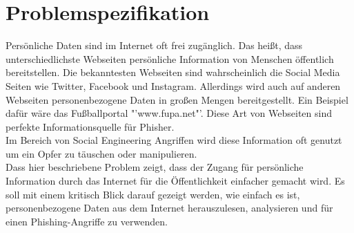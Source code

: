 

\chapter{Problemspezifikation}  %
\label{cha:Problemspezifikation} %
Persönliche Daten sind im Internet oft frei zugänglich. Das heißt, dass unterschiedlichste Webseiten persönliche Information von Menschen öffentlich bereitstellen. Die bekanntesten Webseiten sind wahrscheinlich die Social Media Seiten wie Twitter, Facebook und Instagram. Allerdings wird auch auf anderen Webseiten personenbezogene Daten in großen Mengen bereitgestellt. Ein Beispiel dafür wäre das Fußballportal "'www.fupa.net"'. Diese Art von Webseiten sind perfekte Informationsquelle für Phisher.\\
Im Bereich von Social Engineering Angriffen wird diese Information oft genutzt um ein Opfer zu täuschen oder manipulieren.\\
Dass hier beschriebene Problem zeigt, dass der Zugang für persönliche Information durch das Internet für die Öffentlichkeit einfacher gemacht wird. Es soll mit einem kritisch Blick darauf gezeigt werden, wie einfach es ist, personenbezogene Daten aus dem Internet herauszulesen, analysieren und für einen Phishing-Angriffe zu verwenden.
